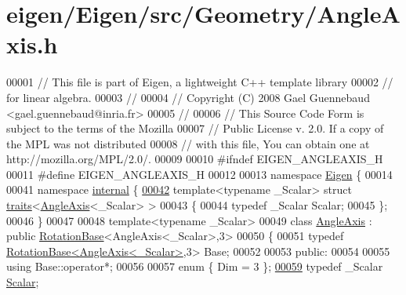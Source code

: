 \hypertarget{eigen_2_eigen_2src_2_geometry_2_angle_axis_8h_source}{}\section{eigen/\+Eigen/src/\+Geometry/\+Angle\+Axis.h}
\label{eigen_2_eigen_2src_2_geometry_2_angle_axis_8h_source}

\begin{DoxyCode}
00001 \textcolor{comment}{// This file is part of Eigen, a lightweight C++ template library}
00002 \textcolor{comment}{// for linear algebra.}
00003 \textcolor{comment}{//}
00004 \textcolor{comment}{// Copyright (C) 2008 Gael Guennebaud <gael.guennebaud@inria.fr>}
00005 \textcolor{comment}{//}
00006 \textcolor{comment}{// This Source Code Form is subject to the terms of the Mozilla}
00007 \textcolor{comment}{// Public License v. 2.0. If a copy of the MPL was not distributed}
00008 \textcolor{comment}{// with this file, You can obtain one at http://mozilla.org/MPL/2.0/.}
00009 
00010 \textcolor{preprocessor}{#ifndef EIGEN\_ANGLEAXIS\_H}
00011 \textcolor{preprocessor}{#define EIGEN\_ANGLEAXIS\_H}
00012 
00013 \textcolor{keyword}{namespace }\hyperlink{namespace_eigen}{Eigen} \{ 
00014 
00041 \textcolor{keyword}{namespace }\hyperlink{namespaceinternal}{internal} \{
\hyperlink{struct_eigen_1_1internal_1_1traits_3_01_angle_axis_3_01___scalar_01_4_01_4}{00042} \textcolor{keyword}{template}<\textcolor{keyword}{typename} \_Scalar> \textcolor{keyword}{struct }\hyperlink{struct_eigen_1_1internal_1_1traits}{traits}<\hyperlink{group___geometry___module_class_eigen_1_1_angle_axis}{AngleAxis}<\_Scalar> >
00043 \{
00044   \textcolor{keyword}{typedef} \_Scalar Scalar;
00045 \};
00046 \}
00047 
00048 \textcolor{keyword}{template}<\textcolor{keyword}{typename} \_Scalar>
00049 \textcolor{keyword}{class }\hyperlink{group___geometry___module_class_eigen_1_1_angle_axis}{AngleAxis} : \textcolor{keyword}{public} \hyperlink{class_eigen_1_1_rotation_base}{RotationBase}<AngleAxis<\_Scalar>,3>
00050 \{
00051   \textcolor{keyword}{typedef} \hyperlink{class_eigen_1_1_rotation_base}{RotationBase<AngleAxis<\_Scalar>},3> Base;
00052 
00053 \textcolor{keyword}{public}:
00054 
00055   \textcolor{keyword}{using} Base::operator*;
00056 
00057   \textcolor{keyword}{enum} \{ Dim = 3 \};
\hyperlink{group___geometry___module_acd9b10692d7d726b28670e4d3a282fe8}{00059}   \textcolor{keyword}{typedef} \_Scalar \hyperlink{group___geometry___module_acd9b10692d7d726b28670e4d3a282fe8}{Scalar};

\end{DoxyCode}
